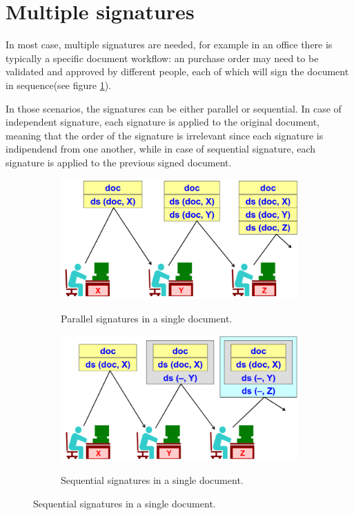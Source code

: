 \section{Multiple signatures}
In most case, multiple signatures are needed, for example in an office
there is typically a specific document workflow: an purchase order 
may need to be validated and approved by different people, each of 
which will sign the document in sequence(see figure \ref{fig:parrallel signatures}). 

In those scenarios, the signatures can be either parallel or
sequential. In case of independent signature, each signature is applied
to the original document, meaning that the order of the signature is
irrelevant since each signature is indipendend from one another, while
in case of sequential signature, each signature is applied to the
previous signed document.
\begin{figure}[H]
  \centering
  \begin{subfigure}[b]{0.45\textwidth}
    \includegraphics[width=\textwidth]{img/paralledl signatures.png}
    \label{fig:parrallel signatures}
    \caption{Parallel signatures in a single document.}
  \end{subfigure}
  \hfill
  \begin{subfigure}[b]{0.45\textwidth}
    \includegraphics[width=\textwidth]{img/sequential signatures.png}
    \label{fig:sequential signatures}
    \caption{Sequential signatures in a single document.}
  \end{subfigure}
\end{figure}

